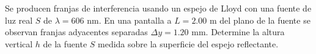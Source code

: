 \item Se producen franjas de interferencia usando un espejo de Lloyd con una fuente de luz real $S$ de $\lambda = 606\text{ nm}$. En una pantalla a $L = 2.00\text{ m}$ del plano de la fuente se observan franjas adyacentes separadas $\Delta y = 1.20\text{ mm}$. Determine la altura vertical $h$ de la fuente $S$ medida sobre la superficie del espejo reflectante.
